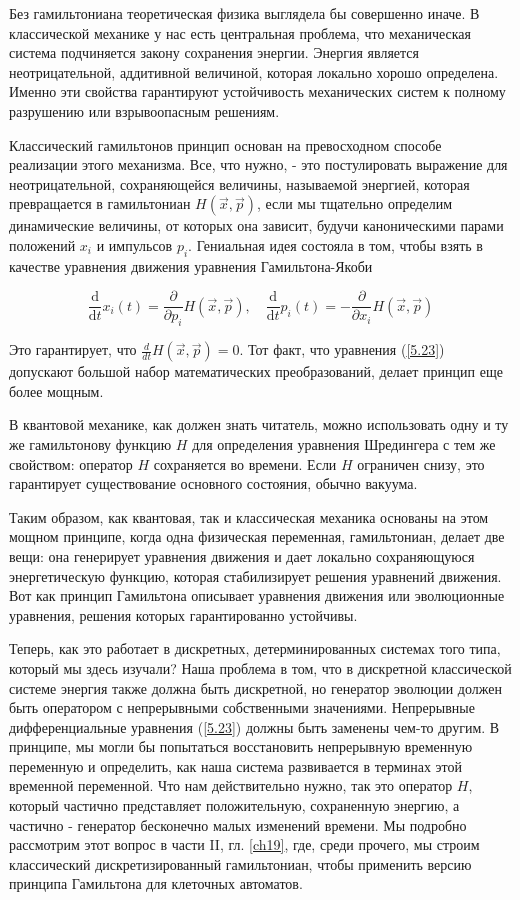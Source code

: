 \documentclass[main.tex]{subfiles}
\begin{document}
Без гамильтониана теоретическая физика выглядела бы совершенно иначе. В классической механике у нас есть центральная проблема, что механическая система подчиняется закону сохранения энергии. Энергия является неотрицательной, аддитивной величиной, которая локально хорошо определена. Именно эти свойства гарантируют устойчивость механических систем к полному разрушению или взрывоопасным решениям.

Классический гамильтонов принцип основан на превосходном способе реализации этого механизма. Все, что нужно, - это постулировать выражение для неотрицательной, сохраняющейся величины, называемой энергией, которая превращается в гамильтониан $H (\vec x,\vec p)$, если мы тщательно определим динамические величины, от которых она зависит, будучи каноническими парами положений $x_i$ и импульсов $p_i$. Гениальная идея состояла в том, чтобы взять в качестве уравнения движения уравнения Гамильтона-Якоби

\begin{equation}\label{5.23}
	\frac{\mathrm{d}}{\mathrm{d} t} x_{i}(t)=\frac{\partial}{\partial p_{i}} H(\vec{x}, \vec{p}), \quad \frac{\mathrm{d}}{\mathrm{d} t} p_{i}(t)=-\frac{\partial}{\partial x_{i}} H(\vec{x}, \vec{p})
\end{equation}

Это гарантирует, что $\frac d {dt} H (\vec x,\vec p) = 0$. Тот факт, что уравнения (\ref{5.23}) допускают большой набор математических преобразований, делает принцип еще более мощным.

В квантовой механике, как должен знать читатель, можно использовать одну и ту же гамильтонову функцию $H$ для определения уравнения Шредингера с тем же свойством: оператор $H$ сохраняется во времени. Если $H$ ограничен снизу, это гарантирует существование основного состояния, обычно вакуума.

Таким образом, как квантовая, так и классическая механика основаны на этом мощном принципе, когда одна физическая переменная, гамильтониан, делает две вещи: она генерирует уравнения движения и дает локально сохраняющуюся энергетическую функцию, которая стабилизирует решения уравнений движения. Вот как принцип Гамильтона описывает уравнения движения или эволюционные уравнения, решения которых гарантированно устойчивы.

Теперь, как это работает в дискретных, детерминированных системах того типа, который мы здесь изучали? Наша проблема в том, что в дискретной классической системе энергия также должна быть дискретной, но генератор эволюции должен быть оператором с непрерывными собственными значениями. Непрерывные дифференциальные уравнения (\ref{5.23}) должны быть заменены чем-то другим. В принципе, мы могли бы попытаться восстановить непрерывную временную переменную и определить, как наша система развивается в терминах этой временной переменной. Что нам действительно нужно, так это оператор $H$, который частично представляет положительную, сохраненную энергию, а частично - генератор бесконечно малых изменений времени. Мы подробно рассмотрим этот вопрос в части II, гл. \ref{ch19}, где, среди прочего, мы строим классический дискретизированный гамильтониан, чтобы применить версию принципа Гамильтона для клеточных автоматов.
\end{document}
